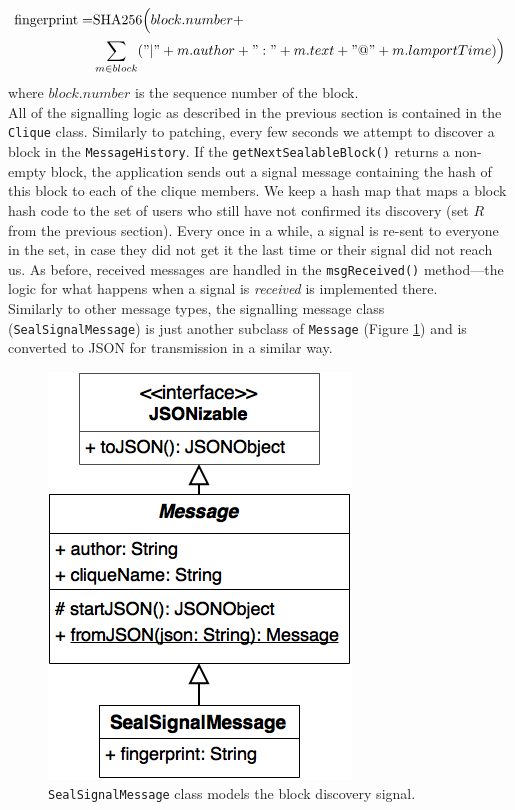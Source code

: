 \documentclass[a4paper, twoside, 12pt]{report}
\begin{document}
\begin{equation*}
    \begin{split}
    \text{fingerprint} = & \text{SHA256}\Big(block.number + \\
                        & \sum_{m \in block}("|" + m.author + ":" + m.text + "@" + m.lamportTime)\Big)
    \end{split}
\end{equation*}
where $block.number$ is the sequence number of the block. \\

All of the signalling logic as described in the previous section is contained in the \texttt{Clique} class. Similarly to patching, every few seconds we attempt to discover a block in the \texttt{MessageHistory}. If the \texttt{getNextSealableBlock()} returns a non-empty block, the application sends out a signal message containing the hash of this block to each of the clique members. We keep a hash map that maps a block hash code to the set of users who still have not confirmed its discovery (set $R$ from the previous section). Every once in a while, a signal is re-sent to everyone in the set, in case they did not get it the last time or their signal did not reach us. As before, received messages are handled in the \texttt{msgReceived()} method---the logic for what happens when a signal is \emph{received} is implemented there. \\

Similarly to other message types, the signalling message class (\texttt{SealSignalMessage}) is just another subclass of \texttt{Message} (Figure \ref{fig:seal_message}) and is converted to JSON for transmission in a similar way.


\begin{figure}[H]
    \captionsetup{width=0.80\textwidth}
    \centering
    \includegraphics[width=0.35\linewidth]{pics/seal_message.png}
    \caption{\label{fig:seal_message} \texttt{SealSignalMessage} class models the block discovery signal.}
\end{figure}
\end{document}
